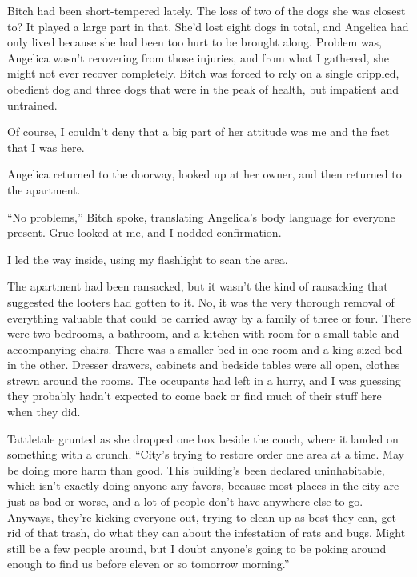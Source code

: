 Bitch had been short-tempered lately.  The loss of two of the dogs she was closest to?  It played a large part in that.  She'd lost eight dogs in total, and Angelica had only lived because she had been too hurt to be brought along.  Problem was, Angelica wasn't recovering from those injuries, and from what I gathered, she might not ever recover completely.  Bitch was forced to rely on a single crippled, obedient dog and three dogs that were in the peak of health, but impatient and untrained.



Of course, I couldn't deny that a big part of her attitude was me and the fact that I was here.



Angelica returned to the doorway, looked up at her owner, and then returned to the apartment.



``No problems,'' Bitch spoke, translating Angelica's body language for everyone present.  Grue looked at me, and I nodded confirmation.



I led the way inside, using my flashlight to scan the area.



The apartment had been ransacked, but it wasn't the kind of ransacking that suggested the looters had gotten to it.  No, it was the very thorough removal of everything valuable that could be carried away by a family of three or four.  There were two bedrooms, a bathroom, and a kitchen with room for a small table and accompanying chairs.  There was a smaller bed in one room and a king sized bed in the other.  Dresser drawers, cabinets and bedside tables were all open, clothes strewn around the rooms.  The occupants had left in a hurry, and I was guessing they probably hadn't expected to come back or find much of their stuff here when they did.



Tattletale grunted as she dropped one box beside the couch, where it landed on something with a crunch. ``City's trying to restore order one area at a time.  May be doing more harm than good.  This building's been declared uninhabitable, which isn't exactly doing anyone any favors, because most places in the city are just as bad or worse, and a lot of people don't have anywhere else to go.  Anyways, they're kicking everyone out, trying to clean up as best they can, get rid of that trash, do what they can about the infestation of rats and bugs.  Might still be a few people around, but I doubt anyone's going to be poking around enough to find us before eleven or so tomorrow morning.''



